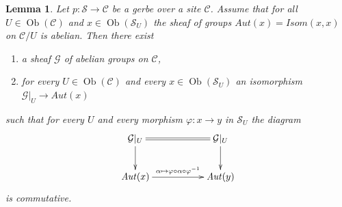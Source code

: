 \documentclass{stacks-project}
\theoremstyle{plain}
\newtheorem{lemma}[subsection]{Lemma}
\theoremstyle{definition}
\theoremstyle{remark}
\numberwithin{equation}{subsection}
\def\Ob{\mathop{\mathrm{Ob}}\nolimits}
\begin{document}
\begin{lemma}
\label{lemma-gerbe-abelian-auts}
Let $p : \mathcal{S} \to \mathcal{C}$ be a gerbe over a site $\mathcal{C}$.
Assume that for all $U \in \Ob(\mathcal{C})$ and $x \in \Ob(\mathcal{S}_U)$
the sheaf of groups $\mathit{Aut}(x) = \mathit{Isom}(x, x)$ on $\mathcal{C}/U$
is abelian. Then there exist
\begin{enumerate}
\item a sheaf $\mathcal{G}$ of abelian groups on $\mathcal{C}$,
\item for every $U \in \Ob(\mathcal{C})$ and every $x \in \Ob(\mathcal{S}_U)$
an isomorphism $\mathcal{G}|_U \to \mathit{Aut}(x)$
\end{enumerate}
such that for every $U$ and every morphism $\varphi : x \to y$
in $\mathcal{S}_U$ the diagram
$$
\xymatrix{
\mathcal{G}|_U \ar[d] \ar@{=}[rr] & & \mathcal{G}|_U \ar[d] \\
\mathit{Aut}(x)
\ar[rr]^{\alpha \mapsto \varphi \circ \alpha \circ \varphi^{-1}} & &
\mathit{Aut}(y)
}
$$
is commutative.
\end{lemma}
\end{document}
